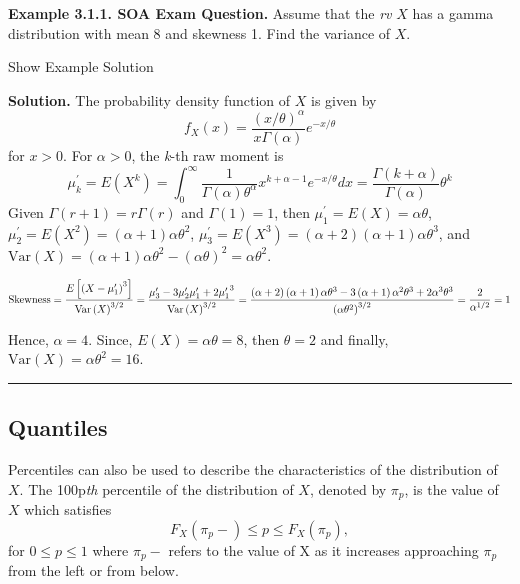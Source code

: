 \documentclass[]{book}
\theoremstyle{definition}
\theoremstyle{definition}
\theoremstyle{definition}
\theoremstyle{remark}
\begin{document}
\textbf{Example 3.1.1. SOA Exam Question.} Assume that the \emph{rv}
\(X\) has a gamma distribution with mean 8 and skewness 1. Find the
variance of \(X\).

Show Example Solution

\hypertarget{toggleExampleLoss.1.1}{}
\textbf{Solution.} The probability density function of \(X\) is given by
\[f_{X}\left( x \right) = \frac{\left( x / \theta \right)^{\alpha}}{x\Gamma\left( \alpha \right)} e^{- x / \theta} \]
for \(x > 0\). For \(\alpha>0\), the \emph{k}-th raw moment is
\[\mu_{k}^{\prime} = E\left( X^{k} \right) = \int_{0}^{\infty}{\frac{1}{\Gamma\left( \alpha \right)\theta^{\alpha}}x^{k + \alpha - 1}e^{- x / \theta} dx} = \frac{\Gamma\left( k + \alpha \right)}{\Gamma\left( \alpha \right)}\theta^{k}\]
Given \(\Gamma\left( r + 1 \right) = r\Gamma\left( r \right)\) and
\(\Gamma\left( 1 \right) = 1\), then
\(\mu_{1}^{\prime} = E\left( X \right) = \alpha\theta\),
\(\mu_{2}^{\prime} = E\left( X^{2} \right) = \left( \alpha + 1 \right)\alpha\theta^{2}\),
\(\mu_{3}^{\prime} = E\left( X^{3} \right) = \left( \alpha + 2 \right)\left( \alpha + 1 \right)\alpha\theta^{3}\),
and
\(\mathrm{Var}\left( X \right) = (\alpha + 1)\alpha\theta^2 - (\alpha\theta)^2 = \alpha\theta^{2}\).

\[\text{Skewness}  = \frac{E\left\lbrack {(X - \mu_{1}^{\prime})}^{3} \right\rbrack}{{\mathrm{Var}\left( X \right)}^{3/2}} = \frac{\mu_{3}^{\prime} - 3\mu_{2}^{\prime}\mu_{1}^{\prime} + 2{\mu_{1}^{\prime}}^{3}}{{\mathrm{Var}\left( X \right)}^{3/2}} \\
 = \frac{\left( \alpha + 2 \right)\left( \alpha + 1 \right)\alpha\theta^{3} - 3\left( \alpha + 1 \right)\alpha^{2}\theta^{3} + 2\alpha^{3}\theta^{3}}{\left( \alpha\theta^{2} \right)^{3/2}} = \frac{2}{\alpha^{1/2}} = 1\]

Hence, \(\alpha = 4\). Since, \(E\left( X \right) = \alpha\theta = 8\),
then \(\theta = 2\) and finally,
\(\mathrm{Var}\left( X \right) = \alpha\theta^{2} = 16\).

\begin{center}\rule{0.5\linewidth}{\linethickness}\end{center}

\subsection{Quantiles}\label{quantiles}

Percentiles can also be used to describe the characteristics of the
distribution of \(X\). The 100p\emph{th} percentile of the distribution
of \(X\), denoted by \(\pi_{p}\), is the value of \(X\) which satisfies
\[F_{X}\left( {\pi_{p}}- \right) \leq p \leq F_{X}\left( \pi_{p} \right) ,\]
for \(0 \leq p \leq 1\) where \(\pi_{p}-\) refers to the value of X as
it increases approaching \(\pi_{p}\) from the left or from below.
\end{document}
